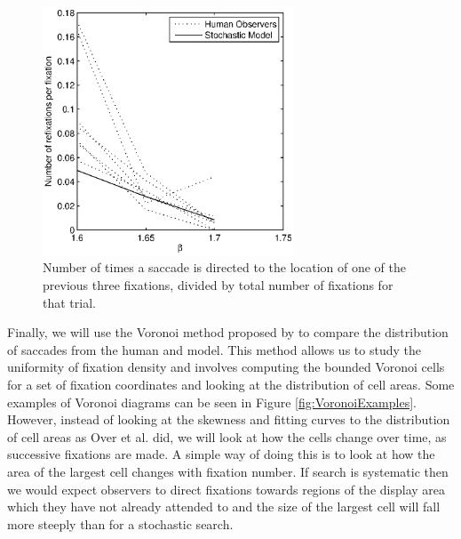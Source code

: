 \begin{figure}
	\centering
		\includegraphics[width=7.5cm]{figures/refixations.eps}
	\caption{Number of times a saccade is directed to the location of one of the previous three fixations, divided by total number of fixations for that trial.}
	\label{fig:refixations}
\end{figure}

\par

Finally, we will use the Voronoi method proposed by \cite{over2006} to compare the distribution of saccades from the human and model. This method allows us to study the uniformity of fixation density and involves computing the bounded Voronoi cells \citep{voronoi1907} for a set of fixation coordinates and looking at the distribution of cell areas. Some examples of Voronoi diagrams can be seen in Figure \ref{fig:VoronoiExamples}. However, instead of looking at the skewness and fitting curves to the distribution of cell areas as Over et al. did, we will look at how the cells change over time, as successive fixations are made. A simple way of doing this is to look at how the area of the largest cell changes with fixation number. If search is systematic then we would expect observers to direct fixations towards regions of the display area which they have not already attended to and the size of the largest cell will fall more steeply than for a stochastic search.
\par

